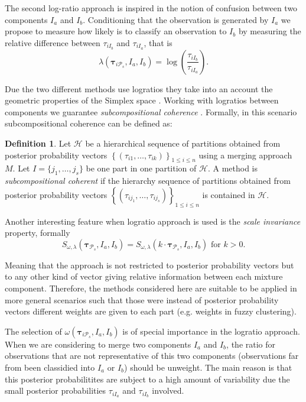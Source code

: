 \documentclass[submit]{smj}
\theoremstyle{definition}
\newtheorem{defn}{Definition}[section]
\newcommand{\m}[1]{\boldsymbol{#1}}
\begin{document}
The second log-ratio approach is inspired in the notion of confusion \citep{hennig2010methods} between two components $I_a$ and $I_b$. Conditioning that the observation is generated by $I_a$ we propose to measure how likely is to classify an observation to $I_b$ by measuring the relative difference between $\tau_{i I_b}$ and $\tau_{i I_a}$, that is 
\[
\lambda(\m\tau_{i \mathcal{P}_s},  I_a,  I_b) = \log \left(\frac{ \tau_{iI_b} }{ \tau_{iI_a} }\right).
\]


Due the two different methods use logratios they take into an account the geometric properties of the Simplex space \citep{aitchison2002simplicial}.  Working with logratios between components we guarantee \emph{subcompositional coherence}  \citep{aitchison1986statistical}. Formally, in this scenario subcompositional coherence can be defined as:

\begin{defn}
Let $\mathcal{H}$ be a hierarchical sequence of partitions obtained from posterior probability vectors $\left\{ \left(\tau_{i1}, \dots, \tau_{ik} \right)\right\}_{1\leq i \leq n}$ using a merging approach $M$. Let $I = \{j_1, \dots, j_s\}$ be one part in one partition of $\mathcal{H}$. A method is \emph{subcompositional coherent} if the hierarchy sequence of partitions obtained  from posterior probability vectors $\left\{ \left(\tau_{ij_1}, \dots, \tau_{ij_s} \right)\right\}_{1\leq i \leq n}$ is contained in $\mathcal{H}$.
\end{defn}

Another interesting feature when logratio approach is used is the \emph{scale invariance} property, formally
\[
S_{\omega, \lambda}( \m\tau_{\mathcal{P}_s},  I_a,  I_b) = S_{\omega, \lambda}(k\cdot \m\tau_{\mathcal{P}_s},  I_a,  I_b) \text{ for $k>0$.}
\] 

Meaning that the approach is not restricted to posterior probability vectors but to any other kind of vector giving relative information between each mixture component. Therefore, the methods considered here are suitable to be applied in more general scenarios such that those were instead of posterior probability vectors different weights are given to each part (e.g. weights in fuzzy clustering).

The selection of $\omega(\m\tau_{i \mathcal{P}_s},  I_a,  I_b)$ is of special importance in the logratio approach. When we are considering to merge two components $I_a$ and $I_b$, the ratio for observations that are not representative of this two components (observations far from been classidied into $I_a$ or $I_b$) should be unweight. The main reason is that this posterior probabilitites are subject to a high amount of variability due the small posterior probabilities $\tau_{iI_a}$ and $\tau_{iI_b}$ involved.
\end{document}
